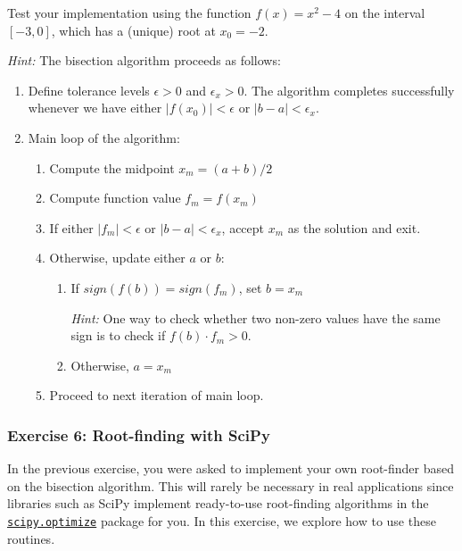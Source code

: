 \documentclass{scrartcl}
\providecommand{\tightlist}{%
      \setlength{\itemsep}{0pt}\setlength{\parskip}{0pt}}
\begin{document}
Test your implementation using the function \(f(x) = x^2 - 4\) on the
interval \([-3,0]\), which has a (unique) root at \(x_0 = -2\).

\emph{Hint:} The bisection algorithm proceeds as follows:

\begin{enumerate}
\def\labelenumi{\arabic{enumi}.}
\tightlist
\item
  Define tolerance levels \(\epsilon > 0\) and \(\epsilon_x > 0\). The
  algorithm completes successfully whenever we have either
  \(|f(x_0)| < \epsilon\) or \(|b-a|<\epsilon_x\).
\item
  Main loop of the algorithm:

  \begin{enumerate}
  \def\labelenumii{\arabic{enumii}.}
  \tightlist
  \item
    Compute the midpoint \(x_m = (a+b)/2\)
  \item
    Compute function value \(f_m = f(x_m)\)
  \item
    If either \(|f_m| < \epsilon\) or \(|b-a|< \epsilon_x\), accept
    \(x_m\) as the solution and exit.
  \item
    Otherwise, update either \(a\) or \(b\):

    \begin{enumerate}
    \def\labelenumiii{\arabic{enumiii}.}
    \item
      If \(sign(f(b)) = sign(f_m)\), set \(b = x_m\)

      \emph{Hint:} One way to check whether two non-zero values have the
      same sign is to check if \(f(b) \cdot f_m > 0\).
    \item
      Otherwise, \(a = x_m\)
    \end{enumerate}
  \item
    Proceed to next iteration of main loop.
  \end{enumerate}
\end{enumerate}

    \hypertarget{exercise-6-root-finding-with-scipy}{%
\subsubsection{Exercise 6: Root-finding with
SciPy}\label{exercise-6-root-finding-with-scipy}}

In the previous exercise, you were asked to implement your own
root-finder based on the bisection algorithm. This will rarely be
necessary in real applications since libraries such as SciPy implement
ready-to-use root-finding algorithms in the
\href{https://docs.scipy.org/doc/scipy/reference/optimize.html}{\texttt{scipy.optimize}}
package for you. In this exercise, we explore how to use these routines.
\end{document}
